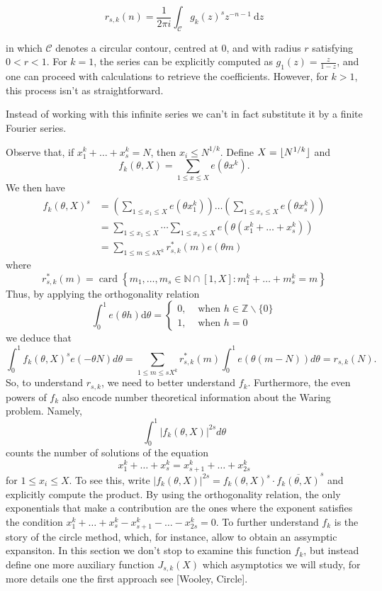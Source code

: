 $$
r_{s, k}(n)=\frac{1}{2 \pi i} \int_{\mathcal{C}} g_{k}(z)^{s} z^{-n-1} \mathrm{~d} z
$$

in which $\mathcal{C}$ denotes a circular contour, centred at 0, and with radius $r$ satisfying $0<r<1$. For $k=1$, the series can be explicitly computed as $g_{1}(z)=\frac{z}{1-z}$, and one can proceed with calculations to retrieve the coefficients. However, for $k>1$, this process isn't as straightforward.

Instead of working with this infinite series we can't in fact substitute it by a finite Fourier series.

Observe that, if $x_{1}^{k}+\ldots+x_{s}^{k}=N$, then $x_i \leq N^{1/k}$. Define $X=\lfloor N^{1/k}\rfloor$ and
$$
f_{k}(\theta, X)=\sum_{1 \leqslant x \leqslant X} e\left(\theta x^{k}\right).
$$
We then have
$$
\begin{aligned}
f_{k}(\theta, X)^{s} & =\left(\sum_{1 \leqslant x_{1} \leqslant X} e\left(\theta x_{1}^{k}\right)\right) \ldots\left(\sum_{1 \leqslant x_{s} \leqslant X} e\left(\theta x_{s}^{k}\right)\right) \\
& =\sum_{1 \leqslant x_{1} \leqslant X} \cdots \sum_{1 \leqslant x_{s} \leqslant X} e\left(\theta\left(x_{1}^{k}+\ldots+x_{s}^{k}\right)\right) \\
& =\sum_{1 \leqslant m \leqslant s X^{k}} r_{s, k}^{*}(m) e(\theta m)
\end{aligned}
$$
where
$$
r_{s, k}^{*}(m)=\operatorname{card}\left\{m_{1}, \ldots, m_{s} \in \mathbb{N} \cap[1, X]: m_{1}^{k}+\ldots+m_{s}^{k}=m\right\}
$$
Thus, by applying the orthogonality relation
$$
\int_{0}^{1} e(\theta h) \mathrm{d} \theta= \begin{cases}0, & \text { when } h \in \mathbb{Z} \backslash\{0\} \\ 1, & \text { when } h=0\end{cases}
$$
we deduce that 
$$
\int_{0}^{1} f_{k}(\theta, X)^{s} e(-\theta N) d \theta=\sum_{1 \leqslant m \leqslant s X^{k}} r_{s, k}^{*}(m) \int_{0}^{1} e(\theta(m-N)) d \theta=r_{s, k}(N).
$$
So, to understand \( r_{s, k} \), we need to better understand \( f_k \). Furthermore, the even powers of \( f_k \) also encode number theoretical information about the Waring problem. Namely,
$$
\int_{0}^{1}\left|f_{k}(\theta, X)\right|^{2s} d \theta
$$
counts the number of solutions of the equation
\begin{equation}\label{Waring system}
x_{1}^{k}+\ldots+x_{s}^{k}=x_{s+1}^{k}+\ldots+x_{2s}^{k}
\end{equation}
for \(1 \leq x_{i} \leq X\). To see this, write \(\left|f_{k}(\theta, X)\right|^{2s} = f_{k}(\theta, X)^{s} \cdot \overline{f_{k}(\theta, X)}^{s}\) and explicitly compute the product. By using the orthogonality relation, the only exponentials that make a contribution are the ones where the exponent satisfies the condition \(x_{1}^{k} + \ldots + x_{s}^{k} - x_{s+1}^{k} - \ldots - x_{2s}^{k} = 0\). To further understand $f_k$ is the story of the circle method, which, for instance, allow to obtain an assymptic expansiton. In this section we don't stop to examine this function $f_{k}$, but instead define one more auxiliary function $J_{s, k}(X)$ which asymptotics we will study, for more details one the first approach see [Wooley, Circle].


